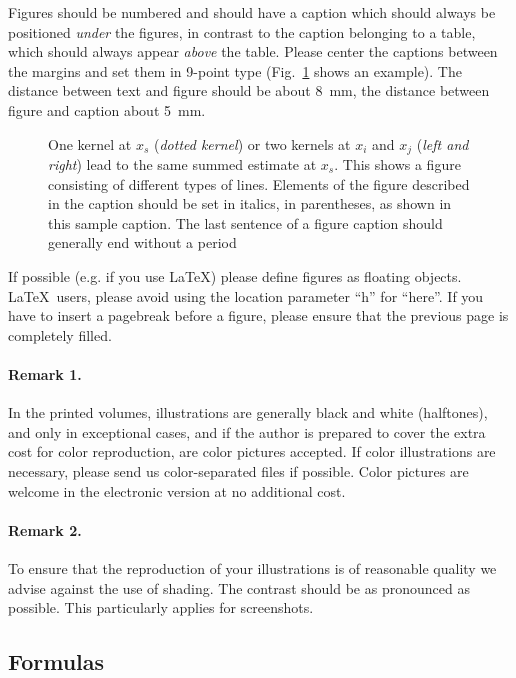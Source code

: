 \documentclass[a4paper]{llncs}
\begin{document}
Figures should be numbered and should have a caption which should
always be positioned {\it under} the figures, in contrast to the caption
belonging to a table, which should always appear {\it above} the table.
Please center the captions between the margins and set them in
9-point type
(Fig.~\ref{fig:example} shows an example).
The distance between text and figure should be about 8~mm, the
distance between figure and caption about 5~mm.
\begin{figure}
\caption{One kernel at $x_s$ ({\it dotted kernel}) or two kernels at
$x_i$ and $x_j$ ({\it left and right}) lead to the same summed estimate
at $x_s$. This shows a figure consisting of different types of
lines. Elements of the figure described in the caption should be set in
italics,
in parentheses, as shown in this sample caption. The last
sentence of a figure caption should generally end without a period}
\label{fig:example}
\end{figure}

If possible (e.g. if you use \LaTeX) please define figures as floating
objects. \LaTeX\ users, please avoid using the location
parameter ``h'' for ``here''. If you have to insert a pagebreak before a
figure, please ensure that the previous page is completely filled.


\paragraph{Remark 1.}

In the printed volumes, illustrations are generally black and white
(halftones), and only in exceptional cases, and if the author is
prepared
to cover the extra cost for color reproduction, are color pictures
accepted. If color illustrations are necessary, please send us
color-separated files if possible.
Color pictures are welcome in the electronic version at no additional
cost.

\paragraph{Remark 2.}

To ensure that the reproduction of your illustrations is of reasonable
quality we advise against the use of shading. The contrast should be as
pronounced as possible. This particularly applies for screenshots.


\subsection{Formulas}
\end{document}
